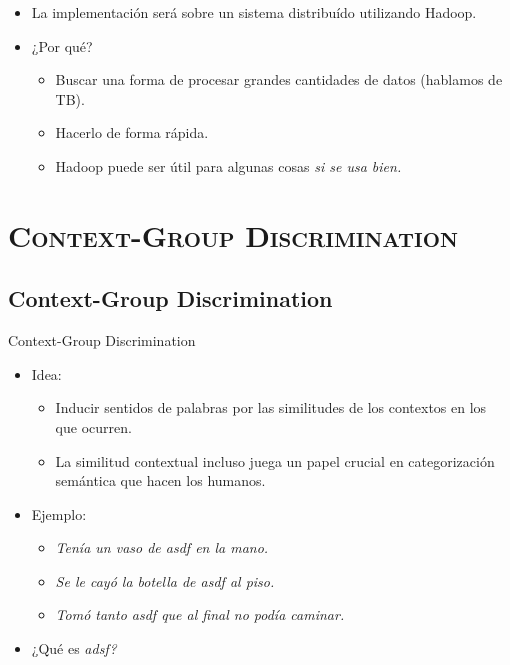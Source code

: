 \documentclass[xcolor=x11names,compress]{beamer}
\renewcommand{\(}{\begin{columns}}
\renewcommand{\)}{\end{columns}}
\newcommand{\<}[1]{\begin{column}{#1}}
\renewcommand{\>}{\end{column}}
\begin{document}
\begin{frame}
\begin{itemize}
\item La implementación será sobre un sistema distribuído utilizando Hadoop.
\item ¿Por qué?
\begin{itemize}
\item Buscar una forma de procesar grandes cantidades de datos (hablamos de TB).
\item Hacerlo de forma rápida.
\item Hadoop puede ser útil para algunas cosas \em{si se usa bien}.
\end{itemize}
\end{itemize}
\end{frame}

\section{\scshape Context-Group Discrimination}
\subsection{Context-Group Discrimination}


\begin{frame}{Context-Group Discrimination}
\begin{itemize}
\item Idea:
\begin{itemize}
\item Inducir sentidos de palabras por las similitudes de los contextos en los que ocurren.
\item La similitud contextual incluso juega un papel crucial en categorización semántica que hacen los humanos.
\end{itemize}
\item Ejemplo:
\begin{itemize}
\item \em{Tenía un vaso de asdf en la mano.}
\item \em{Se le cayó la botella de asdf al piso.}
\item \em{Tomó tanto asdf que al final no podía caminar.}
\end{itemize}
\item ¿Qué es \em{adsf}?
\end{itemize}
\end{frame}
\end{document}

